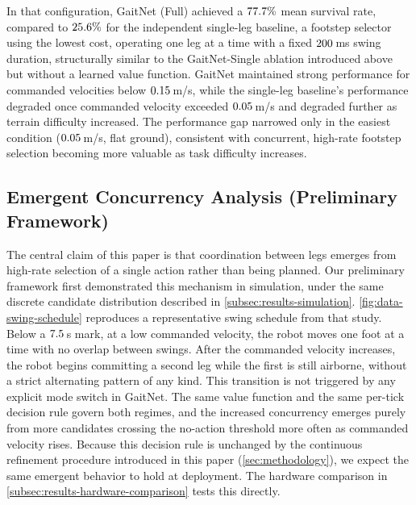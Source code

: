 In that configuration, GaitNet (Full) achieved a
$77.7\%$ mean survival rate, compared to
$25.6\%$ for the independent single-leg
baseline, a footstep selector using the lowest cost, operating one
leg at a time
with a fixed $200$\,ms swing duration,
structurally similar to the GaitNet-Single ablation introduced above
but without a learned value function. GaitNet maintained strong
performance for commanded velocities below
$0.15$\,m/s, while the single-leg
baseline's performance degraded once commanded velocity exceeded
$0.05$\,m/s and degraded further as terrain difficulty
increased. The performance gap narrowed only in the easiest condition
($0.05$\,m/s, flat ground), consistent with concurrent,
high-rate footstep selection becoming more valuable as task difficulty
increases.

\subsection{Emergent Concurrency Analysis (Preliminary Framework)}
\label{subsec:results-concurrency}

The central claim of this paper is that coordination between legs
emerges from high-rate selection of a single action rather than being
planned. Our preliminary framework \cite{Sullivan2025} first
demonstrated this mechanism in simulation, under the same discrete
candidate distribution described in
\autoref{subsec:results-simulation}. \autoref{fig:data-swing-schedule}
reproduces a representative swing schedule from that study. Below a
$7.5$\,s mark, at a low commanded
velocity, the robot moves one foot at a time with no overlap between
swings. After the commanded velocity increases, the robot begins
committing a second leg while the first is still airborne, without a
strict alternating pattern of any kind. This transition is not
triggered by any explicit mode switch in GaitNet. The same value
function and the same per-tick decision rule govern both regimes, and
the increased concurrency emerges purely from more candidates crossing
the no-action threshold more often as commanded velocity rises.
Because this decision rule is unchanged by the continuous refinement
procedure introduced in this paper (\autoref{sec:methodology}), we
expect the same emergent behavior to hold at deployment. The hardware
comparison in \autoref{subsec:results-hardware-comparison} tests this
directly.

